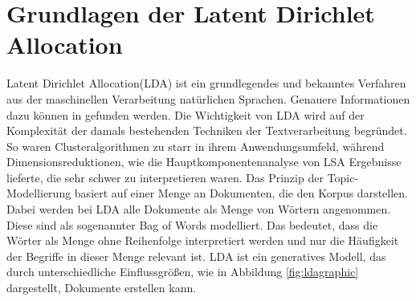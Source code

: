 \documentclass[german,version-2020-11]{uzl-thesis}
\begin{document}


\section{Grundlagen der Latent Dirichlet Allocation }
Latent Dirichlet Allocation(LDA) ist ein grundlegendes und bekanntes Verfahren aus der maschinellen Verarbeitung natürlichen Sprachen. Genauere Informationen dazu können in \cite{a0} gefunden werden. Die Wichtigkeit von LDA wird auf der Komplexität der damals bestehenden Techniken der Textverarbeitung begründet. So waren Clusteralgorithmen zu starr in ihrem Anwendungsumfeld, während Dimensionsreduktionen, wie die Hauptkomponentenanalyse von LSA Ergebnisse lieferte, die sehr schwer zu interpretieren waren. Das Prinzip der Topic-Modellierung basiert auf einer Menge an Dokumenten, die den Korpus darstellen. Dabei werden bei LDA alle Dokumente als Menge von Wörtern angenommen. Diese sind als sogenannter Bag of Words modelliert. Das bedeutet, dass die Wörter als Menge ohne Reihenfolge interpretiert werden und nur die Häufigkeit der Begriffe in dieser Menge relevant ist. LDA ist ein generatives Modell, das durch unterschiedliche Einflussgrößen, wie in Abbildung \ref{fig:ldagraphic} dargestellt, Dokumente erstellen kann. \\
\end{document}

